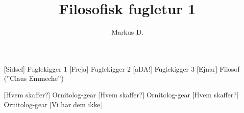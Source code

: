 \documentclass[a4paper,12pt]{article}
\title{Filosofisk fugletur 1}
\author{Markus D.}
\begin{document}
\maketitle




\begin{roles}
	[Sidsel] Fuglekigger 1
	[Freja] Fuglekigger 2
	[aDA!] Fuglekigger 3
	[Ejnar] Filosof (''Claus Emmeche'')
\end{roles}


\begin{props}
	[Hvem skaffer?] Ornitolog-gear
	[Hvem skaffer?] Ornitolog-gear
	[Hvem skaffer?] Ornitolog-gear
	 [Vi har dem ikke]
\end{props}
\end{document}
